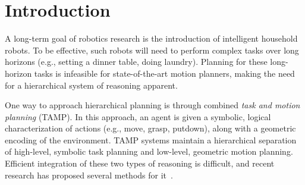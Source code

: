 \section{Introduction}
A long-term goal of robotics research is the introduction of
intelligent household robots.  To be effective, such robots will need
to perform complex tasks over long horizons (e.g., setting a dinner
table, doing laundry). Planning for these long-horizon tasks is
infeasible for state-of-the-art motion planners, making the need for a
hierarchical system of reasoning apparent.

One way to approach hierarchical planning is through combined
\emph{task and motion planning} (TAMP). In this approach, an agent is
given a symbolic, logical characterization of actions (e.g., move,
grasp, putdown), along with a geometric encoding of the
environment. TAMP systems maintain a hierarchical separation of
high-level, symbolic task planning and low-level, geometric motion
planning.  Efficient integration of these two types of reasoning is
difficult, and recent research has proposed several methods for
it~\cite{srivastava2014combined, kaelbling2011hierarchical,
  lagriffoul2014orientation, GarrettWAFR14, dornhege2012semantic}.

